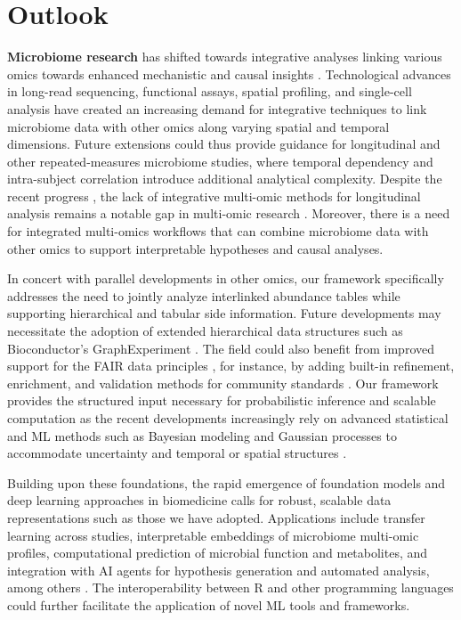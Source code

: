 \documentclass[
  sn-nature,
]{sn-jnl}
\begin{document}
\section{Outlook}\label{sec-discussion}

\textbf{Microbiome research} has shifted towards integrative analyses
linking various omics towards enhanced mechanistic and causal insights
\citep{joos2024, bastiaanssen2023_1}. Technological advances in
long-read sequencing, functional assays, spatial profiling, and
single-cell analysis have created an increasing demand for integrative
techniques to link microbiome data with other omics along varying
spatial and temporal dimensions. Future extensions could thus provide
guidance for longitudinal and other repeated-measures microbiome
studies, where temporal dependency and intra-subject correlation
introduce additional analytical complexity. Despite the recent progress
\citep{martino2021, shi2024}, the lack of integrative multi-omic methods
for longitudinal analysis remains a notable gap in multi-omic research
\citep{sherwani2025}. Moreover, there is a need for integrated
multi-omics workflows that can combine microbiome data with other omics
to support interpretable hypotheses and causal analyses.

In concert with parallel developments in other omics, our framework
specifically addresses the need to jointly analyze interlinked abundance
tables while supporting hierarchical and tabular side information.
Future developments may necessitate the adoption of extended
hierarchical data structures such as Bioconductor's GraphExperiment
\citep{almeida-silva2026}. The field could also benefit from improved
support for the FAIR data principles \citep{wilkinson2016}, for
instance, by adding built-in refinement, enrichment, and validation
methods for community standards
\citep{field2008, mirzayi2021, kelliher2025}. Our framework provides the
structured input necessary for probabilistic inference and scalable
computation as the recent developments increasingly rely on advanced
statistical and ML methods such as Bayesian modeling and Gaussian
processes to accommodate uncertainty and temporal or spatial structures
\citep{jeganathan2021, moreno-indias2021}.

Building upon these foundations, the rapid emergence of foundation
models and deep learning approaches in biomedicine calls for robust,
scalable data representations such as those we have adopted.
Applications include transfer learning across studies, interpretable
embeddings of microbiome multi-omic profiles, computational prediction
of microbial function and metabolites, and integration with AI agents
for hypothesis generation and automated analysis, among others
\citep{delia2023}. The interoperability between R and other programming
languages could further facilitate the application of novel ML tools and
frameworks.
\end{document}
